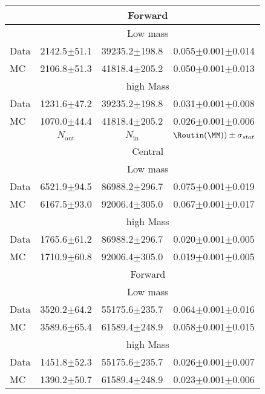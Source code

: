 \begin{table}[hbtp]
\begin{tabular}{l|c|c|c}
 
    \hline 
& \multicolumn{3}{c}{Forward} \\
\hline 
 & \multicolumn{3}{c}{Low mass}   \\ 
  Data & 2142.5$\pm$51.1 & 39235.2$\pm$198.8 & 0.055$\pm$0.001$\pm$0.014 \\
 MC & 2106.8$\pm$51.3 & 41818.4$\pm$205.2 & 0.050$\pm$0.001$\pm$0.013 \\

\hline 
& \multicolumn{3}{c}{high Mass} \\ 
\hline
 Data & 1231.6$\pm$47.2 & 39235.2$\pm$198.8 & 0.031$\pm$0.001$\pm$0.008 \\
 MC & 1070.0$\pm$44.4 & 41818.4$\pm$205.2 & 0.026$\pm$0.001$\pm$0.006 \\

\hline
 & $N_{\text{out}}$ & $N_{\text{in}}$ & $ \Routin (\MM)) \pm \sigma_{stat}$  \\    
\hline
 & \multicolumn{3}{c}{Central} \\
\hline 
 & \multicolumn{3}{c}{Low mass}   \\ 
  Data & 6521.9$\pm$94.5 & 86988.2$\pm$296.7 & 0.075$\pm$0.001$\pm$0.019 \\
 MC & 6167.5$\pm$93.0 & 92006.4$\pm$305.0 & 0.067$\pm$0.001$\pm$0.017 \\

\hline 
& \multicolumn{3}{c}{high Mass} \\ 
\hline
 Data & 1765.6$\pm$61.2 & 86988.2$\pm$296.7 & 0.020$\pm$0.001$\pm$0.005 \\
 MC & 1710.9$\pm$60.8 & 92006.4$\pm$305.0 & 0.019$\pm$0.001$\pm$0.005 \\

 
    \hline 
& \multicolumn{3}{c}{Forward} \\
\hline 
 & \multicolumn{3}{c}{Low mass}   \\ 
  Data & 3520.2$\pm$64.2 & 55175.6$\pm$235.7 & 0.064$\pm$0.001$\pm$0.016 \\
 MC & 3589.6$\pm$65.4 & 61589.4$\pm$248.9 & 0.058$\pm$0.001$\pm$0.015 \\

\hline 
& \multicolumn{3}{c}{high Mass} \\ 
\hline
 Data & 1451.8$\pm$52.3 & 55175.6$\pm$235.7 & 0.026$\pm$0.001$\pm$0.007 \\
 MC & 1390.2$\pm$50.7 & 61589.4$\pm$248.9 & 0.023$\pm$0.001$\pm$0.006 \\

  
\end{tabular}  
\end{table}
